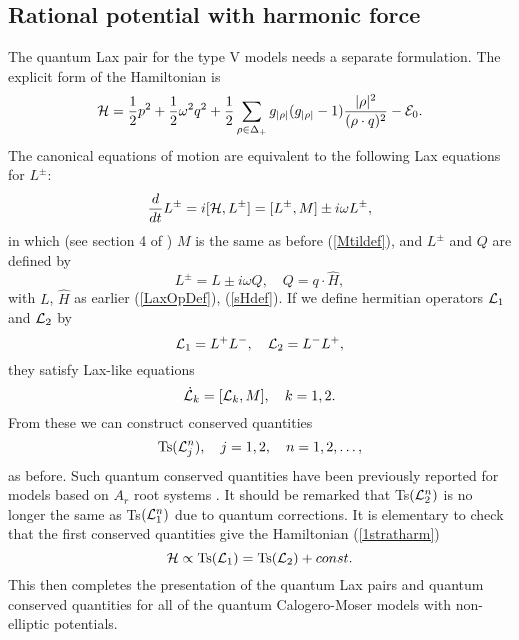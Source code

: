 \documentclass[a4paper,12pt]{article}
\begin{document}
\subsection{Rational potential with harmonic force}
\label{harmL}
The quantum Lax pair for the  type V models needs a separate formulation.
The
explicit form of the Hamiltonian is
\begin{equation}
   {\cal H}={1\over2}p^2+{1\over2}\omega^2q^2+
   {1\over2}\sum_{\rho\in\Delta_+}
      {g_{|\rho|}(g_{|\rho|}-1)}{|\rho|^{2}\over{(\rho\cdot q)^2}}
    -{\cal E}_0.
   \label{1stratharm}
\end{equation}
The canonical equations of motion are equivalent to the following
Lax equations for \(L^{\pm}\):
\begin{equation}
   {d\over dt}{L^\pm}=i[{\cal H},L^\pm]=
   [L^{\pm},{M}]\pm i\omega L^{\pm},
   \label{omegaLM}
\end{equation}
in which (see section 4 of \cite{bcs2})
\({M}\) is the same as before (\ref{Mtildef}), and
 \(L^{\pm}\) and \(Q\) are defined by
\begin{equation}
   L^{\pm}=L\pm i\omega Q, \quad Q=q\cdot\hat{H},
\label{Lpmdef}
\end{equation}
with \(L\), \(\hat{H}\) as earlier (\ref{LaxOpDef}), (\ref{sHdef}).
If we define hermitian operators \({\cal L}_1\) and \({\cal L}_2\) by
\begin{equation}
   {\cal L}_1=L^+L^-,\quad {\cal L}_2=L^-L^+,
   \label{defcalL}
\end{equation}
they satisfy Lax-like equations
   \begin{equation}
   \dot{{\cal L}}_k=[{\cal L}_k,{M}],\quad k=1,2.
\end{equation}
\noindent From these we can construct conserved quantities
\begin{equation}
   \mbox{Ts}({\cal L}_j^n),\quad j=1,2,\quad n=1,2,\ldots,
\end{equation}
as before.
Such quantum conserved quantities have been previously reported for
models based on \(A_r\) root systems \cite{ShasSuth,UjWa}.
It should be remarked that {Ts}\(({\cal L}_2^n)\) is no longer the same as
{Ts}\(({\cal L}_1^n)\) due to quantum corrections.
It is elementary to check that the first conserved quantities
give the Hamiltonian (\ref{1stratharm})
\begin{equation}
  {\cal H} \propto\mbox{Ts}({\cal L}_1)= \mbox{Ts}({\cal
   L}_2) +const.
\end{equation}
This then completes the presentation of the quantum Lax pairs
and quantum conserved quantities for all of
the quantum Calogero-Moser models with non-elliptic potentials.
\end{document}
